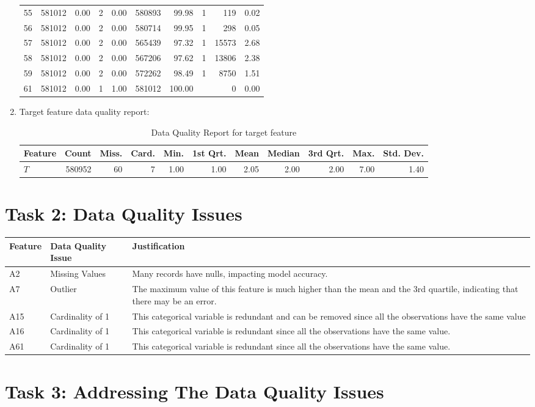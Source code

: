 \documentclass[11pt]{article}
\begin{document}
\begin{enumerate}
\begin{table}[ht]
{\begin{tabular}{|l|r|r|r|l|r|r|l|r|r|}
		55 & 581012 & 0.00 & 2 & 0.00 & 580893 & 99.98 & 1 & 119 & 0.02 \\
		56 & 581012 & 0.00 & 2 & 0.00 & 580714 & 99.95 & 1 & 298 & 0.05 \\
		57 & 581012 & 0.00 & 2 & 0.00 & 565439 & 97.32 & 1 & 15573 & 2.68 \\
		58 & 581012 & 0.00 & 2 & 0.00 & 567206 & 97.62 & 1 & 13806 & 2.38 \\
		59 & 581012 & 0.00 & 2 & 0.00 & 572262 & 98.49 & 1 & 8750 & 1.51 \\
		61 & 581012 & 0.00 & 1 & 1.00 & 581012 & 100.00 &  & 0 & 0.00 \\
		\hline
	\end{tabular}
}

\end{table}


	\item Target feature data quality report:
	\begin{table}[H]
		\caption{Data Quality Report for target feature}
		\label{tab:data_quality}
		\begin{tabular}{|l|r|r|r|r|r|r|r|r|r|r|}
			\hline
			Feature & Count & Miss. & Card. & Min. & 1st Qrt. & Mean & Median & 3rd Qrt. & Max. & Std. Dev. \\
			\hline
			$T$ & 580952 & 60 & 7 & 1.00 & 1.00 & 2.05 & 2.00 & 2.00 & 7.00 & 1.40 \\
			\hline
		\end{tabular}
	\end{table}

\end{enumerate}


\section*{Task 2: Data Quality Issues}
\begin{table}[H]
	\centering
	\label{tab:feature_quality_issues}
	\begin{tabular}{|l|l|p{8cm}|}
		\hline
		\textbf{Feature} & \textbf{Data Quality Issue} & \textbf{Justification} \\
		\hline
		A2 & Missing Values & Many records have nulls, impacting model accuracy. \\
		\hline
		A7 & Outlier & The maximum value of this feature is much higher than the mean and the 3rd quartile, indicating that there may be an error. \\
		\hline
		A15 & Cardinality of 1 & This categorical variable is redundant and can be removed since all the observations have the same value \\
		\hline
		A16 & Cardinality of 1 & This categorical variable is redundant since all the observations have the same value. \\
		\hline
		A61 & Cardinality of 1 & This categorical variable is redundant since all the observations have the same value. \\
		\hline
	\end{tabular}
\end{table}


\section*{Task 3: Addressing The Data Quality Issues}



\end{document}

